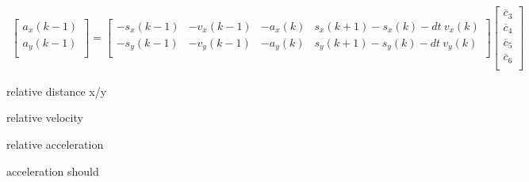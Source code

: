\documentclass[10pt]{article}         %
\begin{document}
\begin{align}
    \begin{bmatrix}
        a_x(k-1) \\ 
        a_y(k-1) \\ 
    \end{bmatrix}
    =
    \begin{bmatrix}
        - s_x(k-1) & - v_x(k-1) & -  a_x(k)  &s_x(k+1) - s_x(k) - dt \  v_x(k) \\
        - s_y(k-1) & - v_y(k-1) & -  a_y(k)  &s_y(k+1) - s_y(k) - dt \  v_y(k) \\
    \end{bmatrix}
    \begin{bmatrix}
        \overline c_3 \\
        \overline c_4 \\
        \overline c_5 \\
        \overline c_6 \\
   \end{bmatrix}
\end{align}



relative distance x/y

relative velocity

relative acceleration 

acceleration should 
\end{document}
